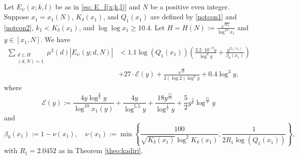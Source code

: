 \documentclass[12pt]{amsart}
\begin{document}
\begin{lemma}\label{small313}
    Let $E_{\psi}(x;k,l)$ be as in \eqref{eq: E_f(x;k,l)} and $N$ be a positive even integer.
    Suppose $x_1 = x_1(N)$, $K_{\delta}(x_1)$, and $Q_1(x_1)$ are defined by \eqref{notcon1} and \eqref{notcon2}, $k_1<K_{\delta}(x_1)$, and $\log\log x_1\ge 10.4$. Let $H=H(N):=\frac{\sqrt{x_1}}{\log^{10}x_1}$ and $y\in[x_1,N]$. We have
    \begin{align}\label{psisum}
        \sum_{\substack{d\le H\\(d,N)=1}}\mu^2(d)\left|E_\psi(y;d,N)\right|&<1.1\log(Q_1(x_1))\left(\frac{3.2\cdot 10^{-8}y}{\log^{8}y}+\frac{y^{\beta_0(x_1)}}{\beta_0(x_1)}\right)\nonumber\\ 
        &+27\cdot\mathcal{E}(y)+\frac{\sqrt{y}}{2(\log 2)\log^{8}y} + 0.4\log^3y,
    \end{align}
    where
    \begin{equation} \label{eq: def-mathcal-E}
        \mathcal{E}(y):=\frac{4y\log^{\frac{9}{2}}y}{\log^{10}x_1(y)}+\frac{4y}{\log^{5.5}y}+\frac{18y^{\frac{11}{12}}}{\log^{\frac{1}{2}}y}+\frac{5}{2}y^{\frac{5}{6}}\log^{\frac{11}{2}}y
    \end{equation}
    and
    \begin{equation}\label{siegelmin}
        \beta_0(x_1):=1-\nu(x_1),\quad \nu(x_1):=\min\left\{\frac{100}{\sqrt{K_{\delta}(x_1)}\log^2 K_{\delta}(x_1)},\frac{1}{2R_1\log(Q_1(x_1))}\right\},
    \end{equation}
    with $R_1=2.0452$ as in Theorem \ref{theo:kadiri}.
\end{lemma}
\end{document}
